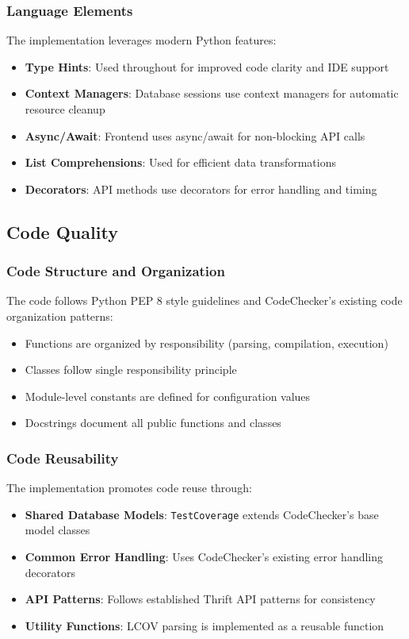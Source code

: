 \subsubsection{Language Elements}

The implementation leverages modern Python features:
\begin{itemize}
    \item \textbf{Type Hints}: Used throughout for improved code clarity and IDE support
    \item \textbf{Context Managers}: Database sessions use context managers for automatic resource cleanup
    \item \textbf{Async/Await}: Frontend uses async/await for non-blocking API calls
    \item \textbf{List Comprehensions}: Used for efficient data transformations
    \item \textbf{Decorators}: API methods use decorators for error handling and timing
\end{itemize}

\subsection{Code Quality}

\subsubsection{Code Structure and Organization}

The code follows Python PEP 8 style guidelines and CodeChecker's existing code organization patterns:
\begin{itemize}
    \item Functions are organized by responsibility (parsing, compilation, execution)
    \item Classes follow single responsibility principle
    \item Module-level constants are defined for configuration values
    \item Docstrings document all public functions and classes
\end{itemize}

\subsubsection{Code Reusability}

The implementation promotes code reuse through:
\begin{itemize}
    \item \textbf{Shared Database Models}: \texttt{TestCoverage} extends CodeChecker's base model classes
    \item \textbf{Common Error Handling}: Uses CodeChecker's existing error handling decorators
    \item \textbf{API Patterns}: Follows established Thrift API patterns for consistency
    \item \textbf{Utility Functions}: LCOV parsing is implemented as a reusable function
\end{itemize}

